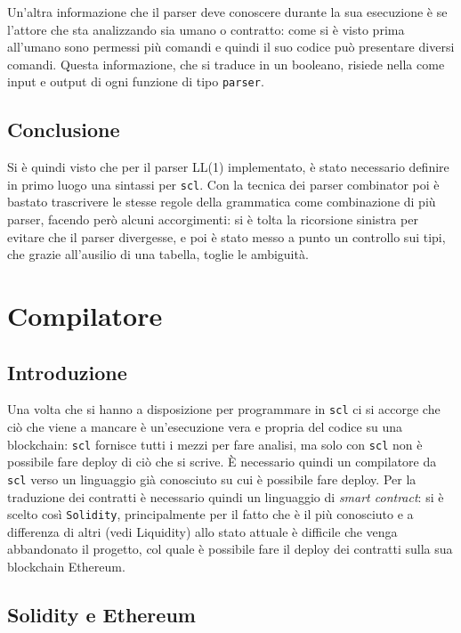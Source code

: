 \documentclass[]{article}
\begin{document}
Un'altra informazione che il parser deve conoscere durante la sua
esecuzione è se l'attore che sta analizzando sia umano o contratto: come
si è visto prima all'umano sono permessi più comandi e quindi il suo
codice può presentare diversi comandi. Questa informazione, che si
traduce in un booleano, risiede nella come input e output di ogni
funzione di tipo \texttt{parser}.

\hypertarget{conclusione-2}{%
\subsection{Conclusione}\label{conclusione-2}}

Si è quindi visto che per il parser LL(1) implementato, è stato
necessario definire in primo luogo una sintassi per \texttt{scl}. Con la
tecnica dei parser combinator poi è bastato trascrivere le stesse regole
della grammatica come combinazione di più parser, facendo però alcuni
accorgimenti: si è tolta la ricorsione sinistra per evitare che il
parser divergesse, e poi è stato messo a punto un controllo sui tipi,
che grazie all'ausilio di una tabella, toglie le ambiguità.

\hypertarget{compilatore}{%
\section{Compilatore}\label{compilatore}}

\hypertarget{introduzione-4}{%
\subsection{Introduzione}\label{introduzione-4}}

Una volta che si hanno a disposizione per programmare in \texttt{scl} ci
si accorge che ciò che viene a mancare è un'esecuzione vera e propria
del codice su una blockchain: \texttt{scl} fornisce tutti i mezzi per
fare analisi, ma solo con \texttt{scl} non è possibile fare deploy di
ciò che si scrive. È necessario quindi un compilatore da \texttt{scl}
verso un linguaggio già conosciuto su cui è possibile fare deploy. Per
la traduzione dei contratti è necessario quindi un linguaggio di
\emph{smart contract}: si è scelto così \texttt{Solidity},
principalmente per il fatto che è il più conosciuto e a differenza di
altri (vedi Liquidity) allo stato attuale è difficile che venga
abbandonato il progetto, col quale è possibile fare il deploy dei
contratti sulla sua blockchain Ethereum.

\hypertarget{solidity-e-ethereum}{%
\subsection{Solidity e Ethereum}\label{solidity-e-ethereum}}
\end{document}
